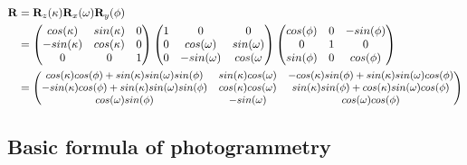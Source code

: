 \documentclass[a4paper,12pt]{report}
\newcommand{\ematr}[1]{
{\bf #1}
}
\newcommand{\escal}[1]{
{\it #1}
}
\begin{document}
 
 \begin{equation}
 \begin{split}
\ematr{R} &= \ematr{R}_{z}(\escal{\kappa}) \ematr{R}_{x}(\escal{\omega}) \ematr{R}_{y}(\escal{\phi}) \\
	  &= \begin{pmatrix}
	      cos(\escal{\kappa}) & sin(\escal{\kappa}) & 0 \\
	      -sin(\escal{\kappa}) & cos(\escal{\kappa}) & 0 \\
	      0 & 0 & 1
	      \end{pmatrix}
	      \begin{pmatrix}
	      1 & 0 & 0 \\
	      0 & cos(\escal{\omega}) & sin(\escal{\omega}) \\
	      0 & -sin(\escal{\omega}) & cos(\escal{\omega} 
	      \end{pmatrix}
	      \begin{pmatrix}
	      cos(\escal{\phi}) & 0 & -sin(\escal{\phi}) \\
	      0 & 1 & 0 \\
	      sin(\phi) & 0 & cos(\phi)      
	      \end{pmatrix} \\
	  &=  
	      \small
	      \begin{pmatrix}
	      cos(\escal{\kappa}) cos(\escal{\phi}) + sin(\escal{\kappa}) sin(\escal{\omega}) sin(\escal{\phi}) & 
	      sin(\escal{\kappa}) cos(\escal{\omega})  & 
	      -cos(\escal{\kappa}) sin(\escal{\phi}) + sin(\escal{\kappa}) sin(\escal{\omega}) cos(\escal{\phi}) 
	      \\
	      -sin(\escal{\kappa}) cos(\escal{\phi}) + sin(\escal{\kappa}) sin(\escal{\omega}) sin(\escal{\phi}) & 
	      cos(\escal{\kappa}) cos(\escal{\omega})  & 
	      sin(\escal{\kappa}) sin(\escal{\phi}) + cos(\escal{\kappa}) sin(\escal{\omega}) cos(\escal{\phi}) 
	      \\	      
	      cos(\escal{\omega}) sin(\escal{\phi}) & 
	      -sin(\escal{\omega})  & 
	      cos(\escal{\omega}) cos(\escal{\phi}) 
	      \\		      
	      \end{pmatrix} 
\end{split}
\end{equation}

\subsection{Basic formula of photogrammetry}
\end{document}
